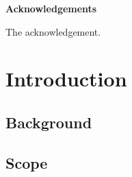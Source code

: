 \documentclass[12pt,letterpaper,toc=flat,oneside]{report}
\theoremstyle{definition}
\theoremstyle{definition}
\theoremstyle{definition}
\theoremstyle{remark}
\begin{document}
\thispagestyle{plain}
    \begin{center}
	\Large\bfseries Acknowledgements
    \end{center}
    \vspace{3em}
    The acknowledgement.
 \newpage
\renewcommand\contentsname{\centering \Large Table of Contents}
\singlespace
\tableofcontents
\newpage
\renewcommand\listtablename{\centering \Large List of Tables}
\listoftables
\newpage
\renewcommand\listfigurename{\centering \Large List of Figures}
\listoffigures
\newpage
\setcounter{chapter}{0}
\doublespacing
\setcounter{page}{1}
	\renewcommand{\thepage}{\arabic{page}}
\hypertarget{introduction}{%
\chapter{Introduction}\label{introduction}}

\hypertarget{background}{%
\section{Background}\label{background}}

\hypertarget{scope}{%
\section{Scope}\label{scope}}
\end{document}
